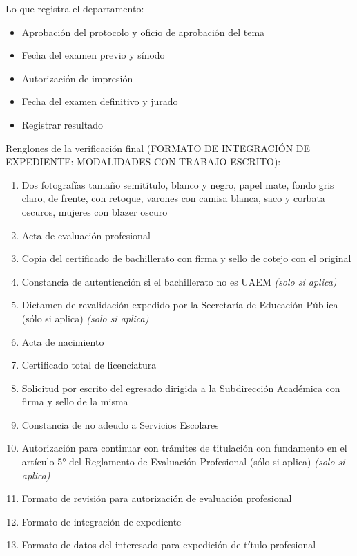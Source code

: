 Lo que registra el departamento:
\begin{itemize}
  \item Aprobación del protocolo y oficio de aprobación del tema
  \item Fecha del examen previo y sínodo
  \item Autorización de impresión
  \item Fecha del examen definitivo y jurado
  \item Registrar resultado
\end{itemize}
Renglones de la verificación final (FORMATO DE INTEGRACIÓN DE EXPEDIENTE: MODALIDADES CON TRABAJO ESCRITO):
\begin{enumerate}
  \item Dos fotografías tamaño semitítulo, blanco y negro, papel mate, fondo gris claro, de frente, con retoque, varones con camisa blanca, saco y corbata oscuros, mujeres con blazer oscuro
  \item Acta de evaluación profesional
  \item Copia del certificado de bachillerato con firma y sello de cotejo con el original
  \item Constancia de autenticación si el bachillerato no es UAEM \emph{(solo si aplica)}
  \item Dictamen de revalidación expedido por la Secretaría de Educación Pública (sólo si aplica) \emph{(solo si aplica)}
  \item Acta de nacimiento
  \item Certificado total de licenciatura
  \item Solicitud por escrito del egresado dirigida a la Subdirección Académica con firma y sello de la misma
  \item Constancia de no adeudo a Servicios Escolares
  \item Autorización para continuar con trámites de titulación con fundamento en el artículo 5° del Reglamento de Evaluación Profesional (sólo si aplica) \emph{(solo si aplica)}
  \item Formato de revisión para autorización de evaluación profesional
  \item Formato de integración de expediente
  \item Formato de datos del interesado para expedición de título profesional
\end{enumerate}
